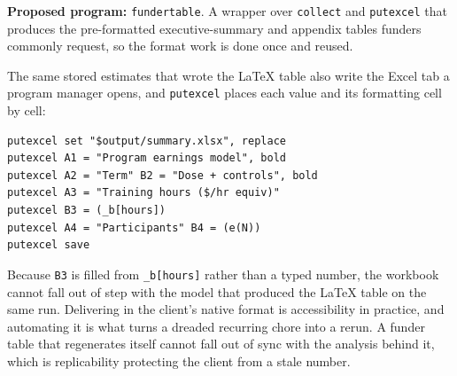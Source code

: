 \documentclass[
    a4paper,
    fontsize=10pt,
    twoside=true,
    numbers=noenddot,
]{kaobook}
\begin{document}
\begin{table}[htbp]
\centering
\caption[Reproducible earnings table, ingested from a do-file]{Program earnings model for a simulated workforce cohort (seed \texttt{20260704}). OLS coefficients with standard errors in parentheses; earnings are dollars per quarter. \textbf{This table is not typed:} \texttt{ch11\_tables.do} estimated the two models and wrote this exact \texttt{tabular} with \texttt{esttab}; the book ingests it with \texttt{\textbackslash input\{ch11\_wage\_table.tex\}}. Rerun the do-file and the numbers here update on the next compile.}
\label{tab:wage}

\end{table}

\begin{kaobox}[frametitle=Ado-file Idea: \texttt{fundertable}]
\textbf{Proposed program:} \texttt{fundertable}. A wrapper over \texttt{collect} and \texttt{putexcel} that produces the pre-formatted executive-summary and appendix tables funders commonly request, so the format work is done once and reused.
\end{kaobox}

The same stored estimates that wrote the \LaTeX{} table also write the Excel tab a program manager opens, and \texttt{putexcel} places each value and its formatting cell by cell:
{\footnotesize
\begin{verbatim}
putexcel set "$output/summary.xlsx", replace
putexcel A1 = "Program earnings model", bold
putexcel A2 = "Term" B2 = "Dose + controls", bold
putexcel A3 = "Training hours ($/hr equiv)"
putexcel B3 = (_b[hours])
putexcel A4 = "Participants" B4 = (e(N))
putexcel save
\end{verbatim}
}
Because \texttt{B3} is filled from \texttt{\_b[hours]} rather than a typed number, the workbook cannot fall out of step with the model that produced the \LaTeX{} table on the same run. Delivering in the client's native format is accessibility in practice, and automating it is what turns a dreaded recurring chore into a rerun. A funder table that regenerates itself cannot fall out of sync with the analysis behind it, which is replicability protecting the client from a stale number.
\end{document}
